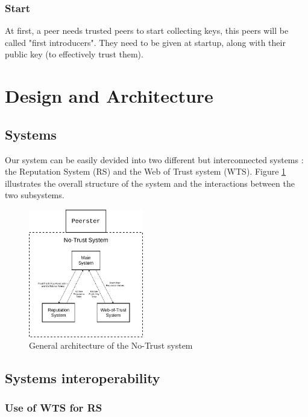 \documentclass[]{article}
\begin{document}
        \subsubsection{Start}
        At first, a peer needs trusted peers to start collecting keys, this peers will be called "first introducers". They need to be given at startup, along with their public key (to effectively trust them).
        
    \section{Design and Architecture}
        
        \subsection{Systems}
        Our system can be easily devided into two different but interconnected systems : the Reputation System (RS) and the Web of Trust system (WTS). \newline
        Figure \ref{fig:no-trust-arch} illustrates the overall structure of the system and the interactions between the two subsystems.
        
        \begin{figure}[h]
        	\includegraphics[width=50mm]{no-trust-arch}
        	\centering
        	\caption{General architecture of the No-Trust system}
        	\label{fig:no-trust-arch}
        \end{figure}
        
        \subsection{Systems interoperability}
        
        \subsubsection{Use of WTS for RS}
        
\end{document}
